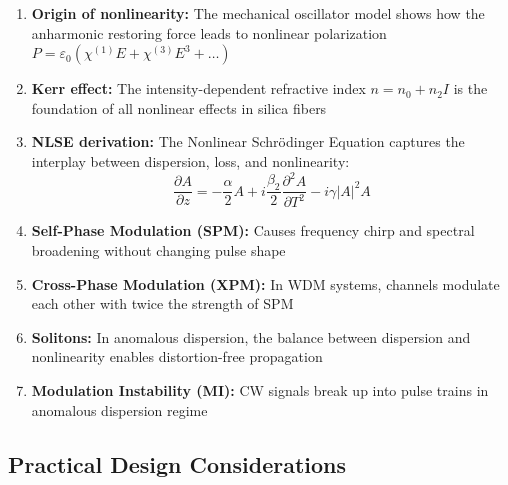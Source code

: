 \documentclass[a4paper, 11pt]{article}
\begin{document}
\begin{enumerate}[leftmargin=*]
    \item \textbf{Origin of nonlinearity:} The mechanical oscillator model shows how the anharmonic restoring force leads to nonlinear polarization $P = \varepsilon_0(\chi^{(1)}E + \chi^{(3)}E^3 + \ldots)$
    
    \item \textbf{Kerr effect:} The intensity-dependent refractive index $n = n_0 + n_2 I$ is the foundation of all nonlinear effects in silica fibers
    
    \item \textbf{NLSE derivation:} The Nonlinear Schrödinger Equation captures the interplay between dispersion, loss, and nonlinearity:
    \begin{equation*}
        \frac{\partial A}{\partial z} = -\frac{\alpha}{2}A + i\frac{\beta_2}{2}\frac{\partial^2 A}{\partial T^2} - i\gamma |A|^2 A
    \end{equation*}
    
    \item \textbf{Self-Phase Modulation (SPM):} Causes frequency chirp and spectral broadening without changing pulse shape
    
    \item \textbf{Cross-Phase Modulation (XPM):} In WDM systems, channels modulate each other with twice the strength of SPM
    
    \item \textbf{Solitons:} In anomalous dispersion, the balance between dispersion and nonlinearity enables distortion-free propagation
    
    \item \textbf{Modulation Instability (MI):} CW signals break up into pulse trains in anomalous dispersion regime
\end{enumerate}

\subsection{Practical Design Considerations}
\end{document}
